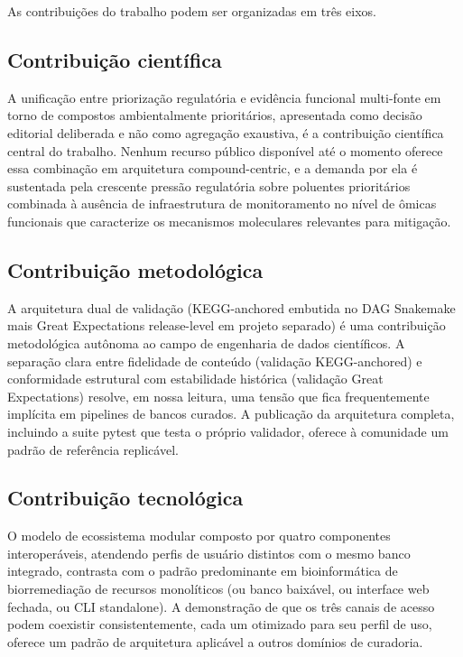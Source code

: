 As contribuições do trabalho podem ser organizadas em três eixos.

\subsection{Contribuição científica}

A unificação entre priorização regulatória e evidência funcional multi-fonte em torno de compostos ambientalmente prioritários, apresentada como decisão editorial deliberada e não como agregação exaustiva, é a contribuição científica central do trabalho. Nenhum recurso público disponível até o momento oferece essa combinação em arquitetura compound-centric, e a demanda por ela é sustentada pela crescente pressão regulatória sobre poluentes prioritários combinada à ausência de infraestrutura de monitoramento no nível de ômicas funcionais que caracterize os mecanismos moleculares relevantes para mitigação.

\subsection{Contribuição metodológica}

A arquitetura dual de validação (KEGG-anchored embutida no DAG Snakemake mais Great Expectations release-level em projeto separado) é uma contribuição metodológica autônoma ao campo de engenharia de dados científicos. A separação clara entre fidelidade de conteúdo (validação KEGG-anchored) e conformidade estrutural com estabilidade histórica (validação Great Expectations) resolve, em nossa leitura, uma tensão que fica frequentemente implícita em pipelines de bancos curados. A publicação da arquitetura completa, incluindo a suite pytest que testa o próprio validador, oferece à comunidade um padrão de referência replicável.

\subsection{Contribuição tecnológica}

O modelo de ecossistema modular composto por quatro componentes interoperáveis, atendendo perfis de usuário distintos com o mesmo banco integrado, contrasta com o padrão predominante em bioinformática de biorremediação de recursos monolíticos (ou banco baixável, ou interface web fechada, ou CLI standalone). A demonstração de que os três canais de acesso podem coexistir consistentemente, cada um otimizado para seu perfil de uso, oferece um padrão de arquitetura aplicável a outros domínios de curadoria.

